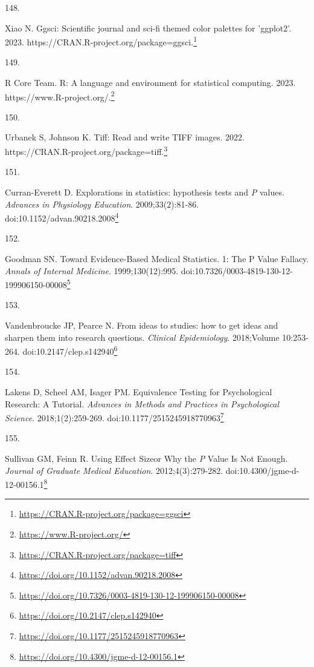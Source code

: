 \documentclass[
  a4paper,
]{book}
\newlength{\cslhangindent}
\newlength{\csllabelwidth}
\newlength{\cslentryspacingunit} %
\newenvironment{CSLReferences}[2] %
 {%
  \setlength{\parindent}{0pt}
  \ifodd #1
  \let\oldpar\par
  \def\par{\hangindent=\cslhangindent\oldpar}
  \fi
  \setlength{\parskip}{#2\cslentryspacingunit}
 }%
 {}
\newcommand{\CSLLeftMargin}[1]{\parbox[t]{\csllabelwidth}{#1}}
\newcommand{\CSLRightInline}[1]{\parbox[t]{\linewidth - \csllabelwidth}{#1}\break}
\renewcommand{\href}[2]{#2\footnote{\url{#1}}}
\begin{document}
\begin{CSLReferences}{0}{0}
\leavevmode{}%
\CSLLeftMargin{148. }%
\CSLRightInline{Xiao N. Ggsci: Scientific journal and sci-fi themed color palettes for 'ggplot2'. 2023. \href{https://CRAN.R-project.org/package=ggsci}{https://CRAN.R-project.org/package=ggsci.}}

\leavevmode{}%
\CSLLeftMargin{149. }%
\CSLRightInline{R Core Team. R: A language and environment for statistical computing. 2023. \href{https://www.R-project.org/}{https://www.R-project.org/.}}

\leavevmode{}%
\CSLLeftMargin{150. }%
\CSLRightInline{Urbanek S, Johnson K. Tiff: Read and write TIFF images. 2022. \href{https://CRAN.R-project.org/package=tiff}{https://CRAN.R-project.org/package=tiff.}}

\leavevmode{}%
\CSLLeftMargin{151. }%
\CSLRightInline{Curran-Everett D. Explorations in statistics: hypothesis tests and {\emph{P}} values. \emph{Advances in Physiology Education}. 2009;33(2):81-86. doi:\href{https://doi.org/10.1152/advan.90218.2008}{10.1152/advan.90218.2008}}

\leavevmode{}%
\CSLLeftMargin{152. }%
\CSLRightInline{Goodman SN. Toward Evidence-Based Medical Statistics. 1: The P Value Fallacy. \emph{Annals of Internal Medicine}. 1999;130(12):995. doi:\href{https://doi.org/10.7326/0003-4819-130-12-199906150-00008}{10.7326/0003-4819-130-12-199906150-00008}}

\leavevmode{}%
\CSLLeftMargin{153. }%
\CSLRightInline{Vandenbroucke JP, Pearce N. From ideas to studies: how to get ideas and sharpen them into research questions. \emph{Clinical Epidemiology}. 2018;Volume 10:253-264. doi:\href{https://doi.org/10.2147/clep.s142940}{10.2147/clep.s142940}}

\leavevmode{}%
\CSLLeftMargin{154. }%
\CSLRightInline{Lakens D, Scheel AM, Isager PM. Equivalence Testing for Psychological Research: A Tutorial. \emph{Advances in Methods and Practices in Psychological Science}. 2018;1(2):259-269. doi:\href{https://doi.org/10.1177/2515245918770963}{10.1177/2515245918770963}}

\leavevmode{}%
\CSLLeftMargin{155. }%
\CSLRightInline{Sullivan GM, Feinn R. Using Effect Size{\textemdash}or Why the {\emph{P}} Value Is Not Enough. \emph{Journal of Graduate Medical Education}. 2012;4(3):279-282. doi:\href{https://doi.org/10.4300/jgme-d-12-00156.1}{10.4300/jgme-d-12-00156.1}}


\end{CSLReferences}
\end{document}
